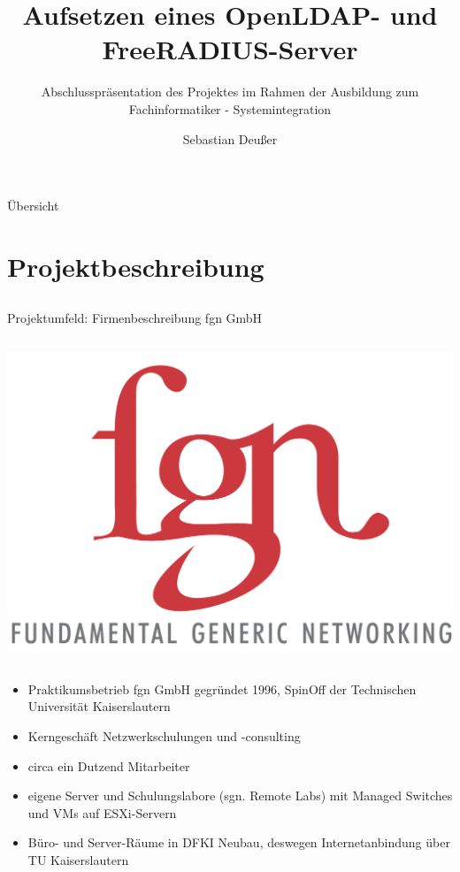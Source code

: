 \documentclass[handout,svgnames]{beamer}
\title[OpenLDAP- und FreeRADIUS-Server]   %
{Aufsetzen eines OpenLDAP- und FreeRADIUS-Server}
\subtitle
{Abschlusspräsentation des Projektes im Rahmen der Ausbildung zum Fachinformatiker - Systemintegration} %
\author %
{Sebastian Deußer}
\begin{document}
\setcounter{framenumber}{-1}
{
\frame{\titlepage}
}


\section{}
\begin{frame}{Übersicht}
\tableofcontents
\end{frame}
\note{}


\section{Projektbeschreibung}
\subsection{}
\begin{frame}{Projektumfeld: Firmenbeschreibung fgn GmbH}
\begin{columns}[c]
	\begin{column}{2.5cm}
		\includegraphics[scale=0.7]{Bilder/logo_fgn.png}
	\end{column}
\end{columns}
\begin{itemize}
	\item Praktikumsbetrieb fgn GmbH gegründet 1996, SpinOff der Technischen Universität Kaiserslautern
	\item Kerngeschäft Netzwerkschulungen und -consulting
	\item circa ein Dutzend Mitarbeiter
	\item eigene Server und Schulungslabore (sgn. Remote Labs) mit Managed Switches und VMs auf ESXi-Servern
	\item Büro- und Server-Räume in DFKI Neubau, deswegen Internetanbindung über TU Kaiserslautern
\end{itemize}
\end{frame}
\end{document}
